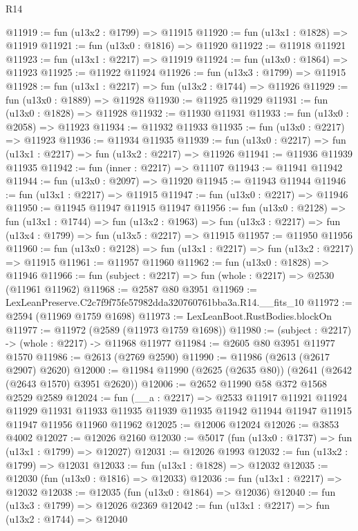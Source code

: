 \begin{lexlean}{R14}
\begin{coremodule}
@11919 := fun (u13x2 : @1799) => @11915
@11920 := fun (u13x1 : @1828) => @11919
@11921 := fun (u13x0 : @1816) => @11920
@11922 := @11918 @11921
@11923 := fun (u13x1 : @2217) => @11919
@11924 := fun (u13x0 : @1864) => @11923
@11925 := @11922 @11924
@11926 := fun (u13x3 : @1799) => @11915
@11928 := fun (u13x1 : @2217) => fun (u13x2 : @1744) => @11926
@11929 := fun (u13x0 : @1889) => @11928
@11930 := @11925 @11929
@11931 := fun (u13x0 : @1828) => @11928
@11932 := @11930 @11931
@11933 := fun (u13x0 : @2058) => @11923
@11934 := @11932 @11933
@11935 := fun (u13x0 : @2217) => @11923
@11936 := @11934 @11935
@11939 := fun (u13x0 : @2217) => fun (u13x1 : @2217) => fun (u13x2 : @2217) => @11926
@11941 := @11936 @11939 @11935
@11942 := fun (inner : @2217) => @11107
@11943 := @11941 @11942
@11944 := fun (u13x0 : @2097) => @11920
@11945 := @11943 @11944
@11946 := fun (u13x1 : @2217) => @11915
@11947 := fun (u13x0 : @2217) => @11946
@11950 := @11945 @11947 @11915 @11947
@11956 := fun (u13x0 : @2128) =>
  fun (u13x1 : @1744) =>
  fun (u13x2 : @1963) => fun (u13x3 : @2217) => fun (u13x4 : @1799) => fun (u13x5 : @2217) => @11915
@11957 := @11950 @11956
@11960 := fun (u13x0 : @2128) => fun (u13x1 : @2217) => fun (u13x2 : @2217) => @11915
@11961 := @11957 @11960
@11962 := fun (u13x0 : @1828) => @11946
@11966 := fun (subject : @2217) => fun (whole : @2217) => @2530 (@11961 @11962)
@11968 := @2587 @80 @3951
@11969 := LexLeanPreserve.C2c7f9f75fe57982dda320760761bba3a.R14.__fits_10
@11972 := @2594 (@11969 @1759 @1698)
@11973 := LexLeanBoot.RustBodies.blockOn
@11977 := @11972 (@2589 (@11973 @1759 @1698))
@11980 := (subject : @2217) -> (whole : @2217) -> @11968 @11977
@11984 := @2605 @80 @3951 @11977 @1570
@11986 := @2613 (@2769 @2590)
@11990 := @11986 (@2613 (@2617 @2907) @2620)
@12000 := @11984 @11990 (@2625 (@2635 @80)) (@2641 (@2642 (@2643 @1570) @3951 @2620))
@12006 := @2652 @11990 @58 @372 @1568 @2529 @2589
@12024 := fun (__a : @2217) =>
  @2533
    @11917
    @11921
    @11924
    @11929
    @11931
    @11933
    @11935
    @11939
    @11935
    @11942
    @11944
    @11947
    @11915
    @11947
    @11956
    @11960
    @11962
@12025 := @12006 @12024
@12026 := @3853 @4002
@12027 := @12026 @2160
@12030 := @5017 (fun (u13x0 : @1737) => fun (u13x1 : @1799) => @12027)
@12031 := @12026 @1993
@12032 := fun (u13x2 : @1799) => @12031
@12033 := fun (u13x1 : @1828) => @12032
@12035 := @12030 (fun (u13x0 : @1816) => @12033)
@12036 := fun (u13x1 : @2217) => @12032
@12038 := @12035 (fun (u13x0 : @1864) => @12036)
@12040 := fun (u13x3 : @1799) => @12026 @2369
@12042 := fun (u13x1 : @2217) => fun (u13x2 : @1744) => @12040

\end{coremodule}
\end{lexlean}
